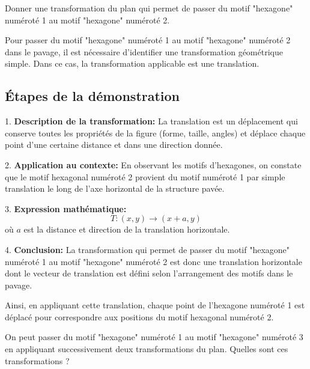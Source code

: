 \documentclass[answers]{exam}
\begin{document}
\begin{questions}
  \question[1] Donner une transformation du plan qui permet de passer du motif "hexagone" numéroté 1 au motif "hexagone" numéroté 2.
  

\begin{solution}
Pour passer du motif "hexagone" numéroté 1 au motif "hexagone" numéroté 2 dans le pavage, il est nécessaire d'identifier une transformation géométrique simple. Dans ce cas, la transformation applicable est une translation.

\subsection*{Étapes de la démonstration}
1. \textbf{Description de la transformation:} La translation est un déplacement qui conserve toutes les propriétés de la figure (forme, taille, angles) et déplace chaque point d'une certaine distance et dans une direction donnée.

2. \textbf{Application au contexte:} En observant les motifs d'hexagones, on constate que le motif hexagonal numéroté 2 provient du motif numéroté 1 par simple translation le long de l'axe horizontal de la structure pavée.

3. \textbf{Expression mathématique:} 
   \[
   T: (x, y) \rightarrow (x + a, y)
   \]
   où \(a\) est la distance et direction de la translation horizontale.

4. \textbf{Conclusion:} La transformation qui permet de passer du motif "hexagone" numéroté 1 au motif "hexagone" numéroté 2 est donc une translation horizontale dont le vecteur de translation est défini selon l'arrangement des motifs dans le pavage.

Ainsi, en appliquant cette translation, chaque point de l'hexagone numéroté 1 est déplacé pour correspondre aux positions du motif hexagonal numéroté 2.
\end{solution}

\question[2] On peut passer du motif "hexagone" numéroté 1 au motif "hexagone" numéroté 3 en appliquant successivement deux transformations du plan. Quelles sont ces transformations ?
\end{questions}
\end{document}
